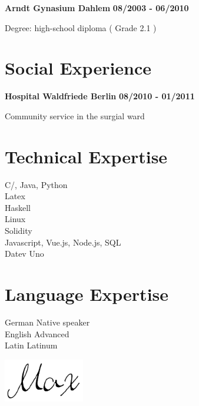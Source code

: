 \documentclass[11pt]{thyv}
\begin{document}
\begin{mdframed}
			\bigskip
			\textbf{Arndt Gynasium Dahlem} 												\hfill \textbf{08/2003 - 06/2010}
			    \begin{outerlist}
			    	\item[] Degree: high-school diploma 								\hfill ( Grade 2.1 )
			    \end{outerlist}

		\section{Social Experience}

			\textbf{Hospital Waldfriede Berlin} 										\hfill \textbf{08/2010 - 01/2011}
			    \begin{outerlist}
			    	\item[] Community service in the surgial ward
			    \end{outerlist}

		\section{Technical Expertise}

			C/\Cplusplus, Java, Python \hfill \ThreeOfFour \\
			Latex \hfill \ThreeOfFour \\
			Haskell \hfill \OneOfFour \\
			Linux \hfill \TwoOfFour \\
			Solidity \hfill \TwoOfFour \\
			Javascript, Vue.js, Node.js, SQL \hfill \TwoOfFour \\
			Datev Uno \hfill \FourOfFour



		\section{Language Expertise}
			German \hfill Native speaker \\
			English \hfill Advanced \\
			Latin \hfill Latinum


		\hfill\includegraphics[width=100pt]{signature2.png}
	\end{mdframed}
\end{document}
